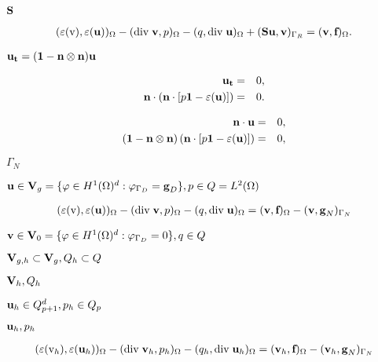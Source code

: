 \documentclass{article}
\begin{document}
$\textbf S$
\pagebreak

\begin{eqnarray*} (\varepsilon(\mathrm v),\varepsilon(\textbf{u}))_{\Omega} - (\textrm{div}\; \textbf{v}, p)_{\Omega} - (q,\textrm{div}\; \textbf{u})_{\Omega} + (\textbf S \textbf u, \textbf{v})_{\Gamma_R} = (\textbf{v}, \textbf{f})_\Omega. \end{eqnarray*}
\pagebreak

$\textbf u_{\textbf t}=(\textbf 1-\textbf n\otimes\textbf n)\textbf u$
\pagebreak

\begin{eqnarray*} \textbf u_{\textbf t} &=& 0, \\ \textbf n \cdot \left(\textbf{n}\cdot [p \textbf{1} - \varepsilon(\textbf{u})] \right) &=& 0. \end{eqnarray*}
\pagebreak

\begin{eqnarray*} \textbf{n}\cdot\textbf u &=& 0, \\ (\textbf 1-\textbf n\otimes\textbf n) \left(\textbf{n}\cdot [p \textbf{1} - \varepsilon(\textbf{u})] \right) &=& 0, \end{eqnarray*}
\pagebreak

$\Gamma_N$
\pagebreak

$\textbf u\in \textbf V_g = \{\varphi \in H^1(\Omega)^d: \varphi_{\Gamma_D}=\textbf g_D\}, p\in Q=L^2(\Omega)$
\pagebreak

\begin{eqnarray*} (\varepsilon(\mathrm v),\varepsilon(\textbf{u}))_{\Omega} - (\textrm{div}\; \textbf{v}, p)_{\Omega} - (q,\textrm{div}\; \textbf{u})_{\Omega} = (\textbf{v}, \textbf{f})_\Omega - (\textbf{v}, \textbf g_N)_{\Gamma_N} \end{eqnarray*}
\pagebreak

$\textbf v\in \textbf V_0 = \{\varphi \in H^1(\Omega)^d: \varphi_{\Gamma_D}=0\},q\in Q$
\pagebreak

$\textbf V_{g,h}\subset \textbf V_g, Q_h\subset Q$
\pagebreak

$\textbf V_h,Q_h$
\pagebreak

$\textbf u_h\in Q_{p+1}^d, p_h\in Q_p$
\pagebreak

$\textbf u_h,p_h$
\pagebreak

\begin{eqnarray*} (\varepsilon(\mathrm v_h),\varepsilon(\textbf u_h))_{\Omega} - (\textrm{div}\; \textbf{v}_h, p_h)_{\Omega} - (q_h,\textrm{div}\; \textbf{u}_h)_{\Omega} = (\textbf{v}_h, \textbf{f})_\Omega - (\textbf{v}_h, \textbf g_N)_{\Gamma_N} \end{eqnarray*}
\pagebreak
\end{document}
